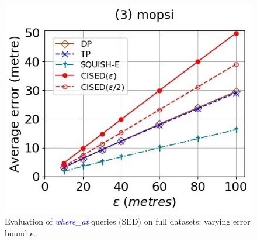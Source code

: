 \begin{figure}[tb!]
	\includegraphics[scale = 0.400]{Figures/Exp-where-SED-error-epsilon-mopsi.jpg}
	\vspace{-1ex}
	\caption{\small Evaluation of \textcolor{blue}{\emph{where\_at}} queries (SED) on full datasets: varying error bound $\epsilon$.}
	\label{fig:query-sed-epsilon}
	\vspace{-1.0ex}
\end{figure}

